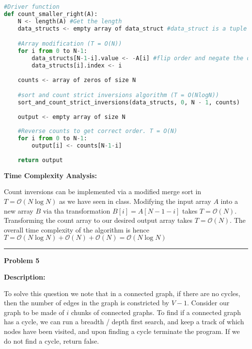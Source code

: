 \documentclass[10pt, a4paper]{article}
\newcommand{\BigO}{\mathcal{O}}
\begin{document}
\begin{lstlisting}[language=Python,caption= Count smaller to right]
#Driver function
def count_smaller_right(A):
    N <- length(A) #Get the length
    data_structs <- empty array of data_struct #data_struct is a tuple of values and tuples of the original array

    #Array modification (T = O(N))
    for i from 0 to N-1:
        data_structs[N-1-i].value <- -A[i] #flip order and negate the original array
        data_structs[i].index <- i
        
    counts <- array of zeros of size N

    #sort and count strict inversions algorithm (T = O(NlogN))
    sort_and_count_strict_inversions(data_structs, 0, N - 1, counts)
    
    output <- empty array of size N
    
    #Reverse counts to get correct order. T = O(N)
    for i from 0 to N-1:
        output[i] <- counts[N-1-i]
        
    return output

\end{lstlisting}

\textbf{Time Complexity Analysis:}

Count inversions can be implemented via a modified merge sort in $T = \BigO(N\log N)$ as we have seen in class. Modifying the input array $A$ into a new array $B$ via tha transformation $B[i] = A[N-1-i]$ takes $T=\BigO(N)$. Transforming the count array to our desired output array takes $T=\BigO(N)$. The overall time complexity of the algorithm is hence $T = \BigO(N\log N) + \BigO(N) + \BigO(N) = \BigO(N\log N)$

\rule{\textwidth}{0.8pt}
\vspace{5pt}


\large{\textbf{Problem 5}}
\normalsize

\textbf{Description:}

To solve this question we note that in a connected graph, if there are no cycles, then the number of edges in the graph is constricted by $V-1$. Consider our graph to be made of $i$ chunks of connected graphs. To find if a connected graph has a cycle, we can run a breadth / depth first search, and keep a track of which nodes have been visited, and upon finding a cycle terminate the program. If we do not find a cycle, return false.
\end{document}
